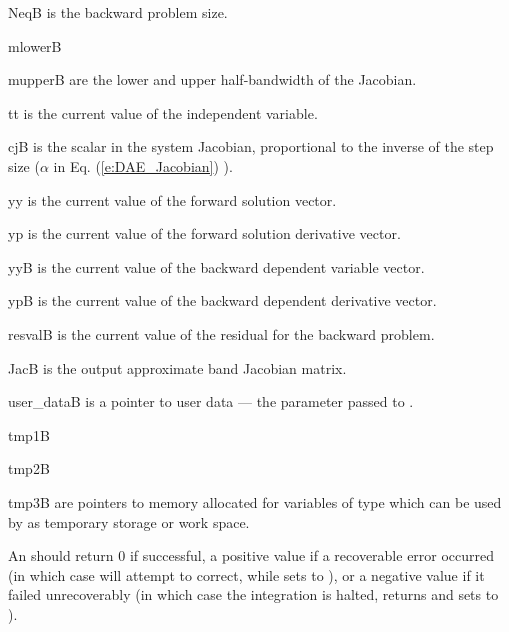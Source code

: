 {
  \begin{args}
  \item[NeqB]
    is the backward problem size.
  \item[mlowerB]
  \item[mupperB]
    are the lower and upper half-bandwidth of the Jacobian.
  \item[tt]
    is the current value of the independent variable.
  \item[cjB]
    is the scalar in the system Jacobian, proportional to the inverse of the
    step size ($\alpha$ in Eq. (\ref{e:DAE_Jacobian}) ).
  \item[yy]
    is the current value of the forward solution vector.
  \item[yp]
    is the current value of the forward solution derivative vector.
  \item[yyB]
    is the current value of the backward dependent variable vector.
  \item[ypB]
    is the current value of the backward dependent derivative vector.
  \item[resvalB]
    is the current value of the residual for the backward problem.
  \item[JacB]
    is the output approximate band Jacobian matrix. 
  \item[user\_dataB]
    is a pointer to user data --- the parameter passed to . 
  \item[tmp1B]
  \item[tmp2B]
  \item[tmp3B]
    are pointers to memory allocated  for variables of type  which 
    can be used by  as temporary storage or work space.    
  \end{args}
}
{
  An  should return 0 if successful, a positive value if a recoverable
  error occurred (in which case {\idas} will attempt to correct, while {\idaband} sets
   to ), or a negative 
  value if it failed unrecoverably (in which case the integration is halted, 
  returns  and {\idadense} sets  to
  ).
}
